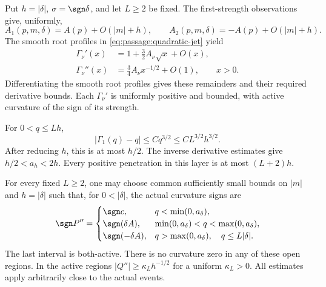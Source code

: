 Put \(h=|\delta|\), \(\sigma=\sgn\delta\), and let \(L\ge2\) be fixed.
The first-strength observations give, uniformly,
\[
 A_1(p,m,\delta)=A(p)+O(|m|+h),\qquad
 A_2(p,m,\delta)=-A(p)+O(|m|+h).
\]
The smooth root profiles in \eqref{eq:passage:quadratic-jet} yield
\begin{align}
 \Gamma_\nu'(x)
  &=1+\tfrac32 A_\nu\sqrt{x}+O(x),\label{eq:inner-derivative}\\
 \Gamma_\nu''(x)
  &=\tfrac34 A_\nu x^{-1/2}+O(1),\qquad x>0.\label{eq:inner-curvature}
\end{align}
Differentiating the smooth root profiles gives these remainders and their
required derivative bounds. Each $\Gamma_\nu'$ is uniformly positive and
bounded, with active curvature of the sign of its strength.

For \(0<q\le Lh\),
\begin{equation}\label{eq:first-correction}
 |\Gamma_1(q)-q|\le Cq^{3/2}\le C L^{3/2}h^{3/2}.
\end{equation}
After reducing \(h\), this is at most \(h/2\).
The inverse derivative estimates give \(h/2<a_h<2h\).
Every positive penetration in this layer is at most \((L+2)h\).

\begin{lemma}\label{lem:event-layer}
For every fixed \(L\ge2\), one may choose common sufficiently small
bounds on \(|m|\) and \(h=|\delta|\) such that, for \(0<|\delta|\),
the actual curvature signs are
\begin{equation}\label{eq:event-signs}
 \sgn P''=
 \begin{cases}
 \sgn c,&q<\min(0,a_\delta),\\
 \sgn(\delta A),&\min(0,a_\delta)<q<\max(0,a_\delta),\\
 \sgn(-\delta A),&
       q>\max(0,a_\delta),\quad q\le L|\delta|.
 \end{cases}
\end{equation}
The last interval is both-active. There is no curvature zero in any
of these open regions. In the active regions
\(|Q''|\ge\kappa_L h^{-1/2}\) for a uniform \(\kappa_L>0\).
All estimates apply arbitrarily close to the actual events.
\end{lemma}

